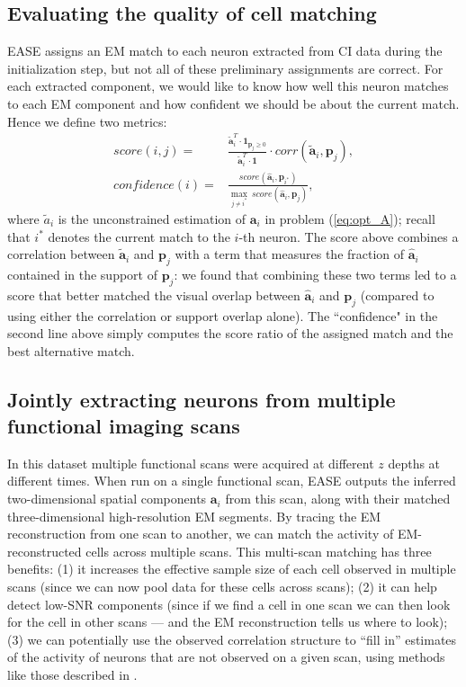 \documentclass[10pt,letterpaper]{article}
\begin{document}
{\subsection{Evaluating the quality of cell matching}
EASE assigns an EM match to each neuron extracted from CI data during the initialization step, but not all of these preliminary assignments are correct. For each extracted component, we would like to know how well this neuron matches to each EM component and how confident we should be about the current match. Hence we define two metrics: 
 \begin{align}
 score(i, j) =& \frac{\tilde{\bm{a}}_i^T \cdot \bm{1}_{\bm{p}_j\geq 0} }{\tilde{\bm{a}}_i^T \cdot \bm{1}} \cdot corr(\tilde{\bm{a}}_{i}, \bm{p}_j),  \label{eq:score}\\
 confidence(i) =& \frac{score(\hat{\bm{a}}_i, \bm{p}_{i^*})}{\underset{j \neq i^*}{\max}~ score(\hat{\bm{a}}_i, \bm{p}_{j}) }, \label{eq:confidence}
 \end{align}
 where $\tilde{a}_i$ is the unconstrained estimation of $\bm{a}_i$ in problem (\ref{eq:opt_A}); recall that $i^*$ denotes the current match to the $i$-th neuron. 
 The score above combines a correlation between $\tilde{\bm{a}}_{i}$ and $\bm{p}_j$ with a term that measures the fraction of $\hat{\bm{a}}_{i}$ contained in the support of $\bm{p}_j$: we found that combining these two terms led to a score that better matched the visual overlap between $\hat{\bm{a}}_{i}$ and $\bm{p}_j$ (compared to using either the correlation or support overlap alone).  
 The ``confidence" in the second line above simply computes the score ratio of the assigned match and the best alternative match.
 
\subsection{Jointly extracting neurons from multiple functional imaging scans}
\label{sec:methods-joint-extraction}
In this dataset multiple functional scans were acquired at different $z$ depths at different times.  When run on a single functional scan, EASE outputs the inferred two-dimensional spatial components $\bm{a}_i$ from this scan, along with their matched three-dimensional high-resolution EM segments.  By tracing the EM reconstruction from one scan to another, we can match the activity of EM-reconstructed cells across multiple scans.  This multi-scan matching has three benefits: (1) it increases the effective sample size of each cell observed in multiple scans (since we can now pool data for these cells across scans); (2) it can help detect low-SNR components (since if we find a cell in one scan we can then look for the cell in other scans --- and the EM reconstruction tells us where to look); (3) we can potentially use the observed correlation structure to ``fill in'' estimates of the activity of neurons that are not observed on a given scan, using methods like those described in \citep{Soudry2015}.

}
\end{document}

